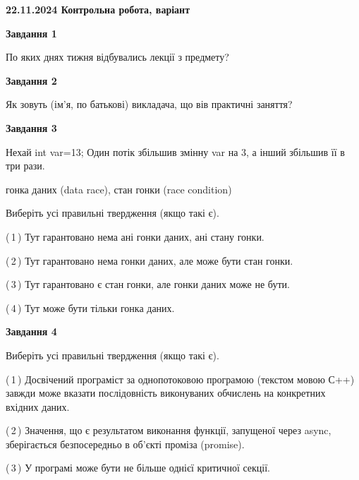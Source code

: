 \documentclass[12pt, ukrainian]{article}
\begin{document}
\begin {large}

\textbf{22.11.2024 Контрольна робота, варіант  }\par


{

\begin{center}
\textbf{Завдання 1}
\end{center}

По яких днях тижня відбувались лекції з предмету?


\begin{center}
\textbf{Завдання 2}
\end{center}

Як зовуть (ім'я, по батькові) викладача, що вів практичні заняття?


\begin{center}
\textbf{Завдання 3}
\end{center}

Нехай int var=13; Один потік збільшив змінну var на 3, а інший збільшив її в три рази.

гонка даних (data race), стан гонки (race condition)

Виберіть усі правильні твердження (якщо такі є).\par
\vspace{2mm}
(\,1\,) Тут гарантовано нема ані гонки даних, ані стану гонки.%

(\,2\,) Тут гарантовано нема гонки даних, але може бути стан гонки.%

(\,3\,) Тут гарантовано є стан гонки, але гонки даних може не бути.%

(\,4\,) Тут може бути тільки гонка даних.%


\begin{center}
\textbf{Завдання 4}
\end{center}

Виберіть усі правильні твердження (якщо такі є).\par
\vspace{2mm}

(\,1\,) Досвічений програміст за однопотоковою програмою (текстом мовою С++) завжди може вказати послідовність виконуваних обчислень на конкретних вхідних даних.%

(\,2\,) Значення, що є результатом виконання функції, запущеної через async, зберігається безпосередньо в об’єкті проміза (promise).%

(\,3\,) У програмі може бути не більше однієї критичної секції.%

}
\end{large}
\end{document}
